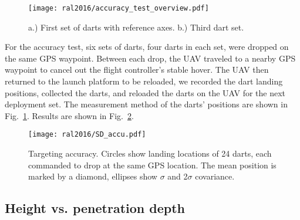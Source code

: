 

\begin{figure} \centering
  {\texttt{[image: ral2016/accuracy\_test\_overview.pdf]}}
 \caption{a.) First set of darts with reference axes. b.) Third dart set. }
 \label{fig:Accu_test_darts}
\end{figure}

For the accuracy test, six sets of darts, four darts in each set, were dropped on the same GPS waypoint.
Between each drop, the UAV traveled to a nearby GPS waypoint to cancel out the flight controller's stable hover.
The UAV then returned to the launch platform to be reloaded, we recorded the dart landing positions, collected the darts, and reloaded the darts on the UAV for the next deployment set.
The measurement method of the darts' positions are shown in Fig.~\ref{fig:Accu_test_darts}.
Results are shown in Fig.~\ref{fig:SD_accu.pdf}.

\begin{figure} \centering
	{\texttt{[image: ral2016/SD\_accu.pdf]}}
	\caption{
		Targeting accuracy.
		Circles show landing locations of 24 darts, each commanded to drop at the same GPS location.
		The mean position is marked by a diamond, ellipses show  $\sigma$ and 2$\sigma$ covariance.
	\label{fig:SD_accu.pdf}}
\end{figure}


\subsection{Height vs. penetration depth}


